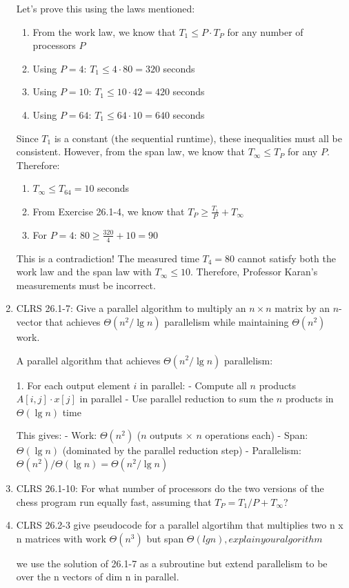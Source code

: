 \documentclass{article}
\theoremstyle{definition}
\begin{document}
\begin{enumerate}
    Let's prove this using the laws mentioned:
    
    \begin{enumerate}
        \item From the work law, we know that $T_1 \leq P \cdot T_P$ for any number of processors $P$
        \item Using $P=4$: $T_1 \leq 4 \cdot 80 = 320$ seconds
        \item Using $P=10$: $T_1 \leq 10 \cdot 42 = 420$ seconds
        \item Using $P=64$: $T_1 \leq 64 \cdot 10 = 640$ seconds
    \end{enumerate}
    
    Since $T_1$ is a constant (the sequential runtime), these inequalities must all be consistent. However, from the span law, we know that $T_{\infty} \leq T_P$ for any $P$. Therefore:
    
    \begin{enumerate}
        \item $T_{\infty} \leq T_{64} = 10$ seconds
        \item From Exercise 26.1-4, we know that $T_P \geq \frac{T_1}{P} + T_{\infty}$
        \item For $P=4$: $80 \geq \frac{320}{4} + 10 = 90$
    \end{enumerate}
    
    This is a contradiction! The measured time $T_4 = 80$ cannot satisfy both the work law and the span law with $T_{\infty} \leq 10$. Therefore, Professor Karan's measurements must be incorrect.
    
    \item CLRS 26.1-7: Give a parallel algorithm to multiply an $n \times n$ matrix by an $n$-vector that achieves $\Theta(n^2/\lg n)$ parallelism while maintaining $\Theta(n^2)$ work.
    
    A parallel algorithm that achieves $\Theta(n^2/\lg n)$ parallelism:

    1. For each output element $i$ in parallel:
       - Compute all $n$ products $A[i,j] \cdot x[j]$ in parallel
       - Use parallel reduction to sum the $n$ products in $\Theta(\lg n)$ time

    This gives:
    - Work: $\Theta(n^2)$ ($n$ outputs $\times$ $n$ operations each)
    - Span: $\Theta(\lg n)$ (dominated by the parallel reduction step)
    - Parallelism: $\Theta(n^2)/\Theta(\lg n) = \Theta(n^2/\lg n)$

    \item CLRS 26.1-10: For what number of processors do the two versions of the chess program run equally fast, assuming that $T_P = T_1/P + T_{\infty}$?
    
    \item CLRS 26.2-3 give pseudocode for a parallel algortihm that multiplies two n x n matrices with work $\Theta(n^3)$ but span $\Theta(lg n), explain your algorithm$
    
    we use the solution of 26.1-7 as a subroutine but extend parallelism to be over the n vectors of dim n in parallel. 

\end{enumerate}
\end{document}
